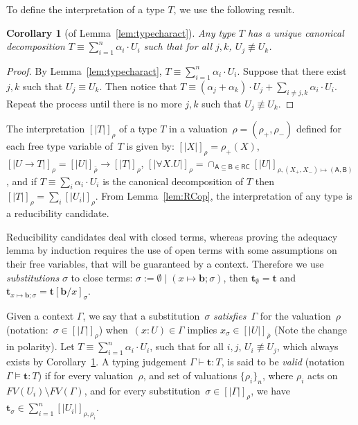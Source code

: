 \documentclass[colorlinks=true,linkcolor=black,urlcolor=black,citecolor=blue,submission,copyright,creativecommons]{eptcs}
\newtheorem{corollary}[theorem]{Corollary}
\newcommand{\ve}[1]{\mathrm{\textbf{#1}}}
\newcommand{\type}{\colon\!}
\newcommand{\sui}[1]{\sum_{i=1}^{#1}}
\newcommand{\RC}{\mathsf{RC}}
\newcommand{\bcal}[1]{\mathsf{#1}}
\newcommand{\denot}[1]{{[\!|{#1}|\!]}}
\begin{document}
To define the interpretation of a type $T$, we use the following
result.

\begin{corollary}[of Lemma~\ref{lem:typecharact}]\label{cor:typedecomp}
  Any type $T$ has a unique canonical decomposition
  $T\equiv\sui{n}\alpha_i\cdot U_i$ such that for all $j,k$, $U_j\not\equiv
  U_k$.
\end{corollary}
\begin{proof}
   By Lemma~\ref{lem:typecharact}, $T\equiv\sui{n}\alpha_i\cdot
   U_i$. Suppose that there exist
  $j,k$ such that $U_j\equiv U_k$. Then notice that $T\equiv
  (\alpha_j+\alpha_k)\cdot U_j+\sum_{i\neq j,k}\alpha_i\cdot U_i$.
  Repeat the process until there is no more $j,k$
  such that $U_j\not\equiv U_k$.
\end{proof}

The interpretation $\denot{T}_\rho$ of a type $T$ in a
valuation~$\rho=(\rho_+,\rho_-)$ defined for each free type variable
of~$T$ is given by: $\denot{X}_\rho=\rho_+(X)$, $\denot{U\to
  T}_\rho=\denot{U}_{\bar\rho}\to\denot{T}_\rho$, $\denot{\forall
  X.U}_\rho=\cap_{\bcal{A}\subseteq\bcal{B}\in\RC}\denot{U}_{\rho,(X_+,X_-)\mapsto(\bcal{A},\bcal{B})}$,
and if $T\equiv\sum_i\alpha_i\cdot U_i$ is the canonical decomposition
of $T$ then 
$\denot{T}_\rho=\sum_i\denot{U_i}_{\rho}$.
From Lemma~\ref{lem:RCop}, the interpretation of any type is a reducibility candidate.

Reducibility candidates deal with closed terms, whereas proving the adequacy lemma by induction requires the use of open terms with some assumptions on their free variables, that will be guaranteed by a context. Therefore we use \emph{substitutions} $\sigma$ to close terms: $\sigma := \emptyset \;|\; (x \mapsto\ve b;\sigma)$, then $\ve{t}_{\emptyset} = \ve{t}$ and $\ve{t}_{x \mapsto \ve b;\sigma} = \ve{t}[\ve b/x]_{\sigma}$.

  Given a context $\Gamma$, we say that a substitution~$\sigma$
  \emph{satisfies}~$\Gamma$ for the valuation~$\rho$
  (notation:~$\sigma\in\denot{\Gamma}_{\rho}$) when~$(x:U) \in \Gamma$
  implies $x_\sigma\in\denot{U}_{\bar\rho}$ (Note the change in
  polarity).  Let $T\equiv\sui{n}\alpha_i\cdot U_i$, such that for all
  $i,j$, $U_i\not\equiv U_j$, which always exists by
  Corollary~\ref{cor:typedecomp}.
A typing judgement $\Gamma\vdash\ve t\type T$, is said to be \emph{valid} (notation $\Gamma\models\ve t\type T$) if for every valuation~$\rho$, and set of valuations $\{\rho_i\}_n$, where $\rho_i$ acts on $FV(U_i)\setminus FV(\Gamma)$, and for every substitution~$\sigma\in\denot{\Gamma}_\rho$, we have $\ve{t}_{\sigma}\in\sum_{i=1}^n\denot{U_i}_{\rho,\rho_i}$.
\medskip
\end{document}
